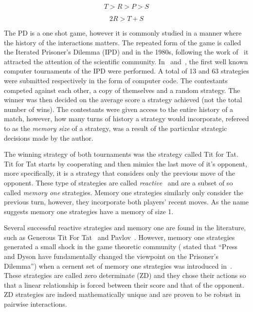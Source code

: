 \documentclass[10pt]{article}
\begin{document}
\begin{equation}\label{eq:pd_constrain_one}
    T > R > P > S
\end{equation}

\begin{equation}\label{eq:pd_constrain_two}
    2R > T + S
\end{equation}

The PD is a one shot game, however it is commonly studied in a manner where the
history of the interactions matters. The repeated form of the game is called the
Iterated Prisoner's Dilemma (IPD) and in the 1980s, following the work
of~\cite{Axelrod1980a, Axelrod1980b} it attracted the attention of the
scientific community. In~\cite{Axelrod1980a} and~\cite{Axelrod1980b}, the first
well known computer tournaments of the IPD were performed. A total of 13 and 63
strategies were submitted respectively in the form of computer code. The
contestants competed against each other, a copy of themselves and a random
strategy. The winner was then decided on the average score a strategy achieved (not
the total number of wins). The contestants were given access to the entire
history of a match, however, how many turns of history a strategy would
incorporate, refereed to as the \textit{memory size} of a strategy, was a result
of the particular strategic decisions made by the author.

The winning strategy of both tournaments was the strategy called Tit for Tat.
Tit for Tat starts by cooperating and then mimics the last move of it's
opponent, more specifically, it is a strategy that considers only the previous
move of the opponent. These type of strategies are called
\textit{reactive}~\cite{Nowak1989} and are a subset of so called \textit{memory
one} strategies. Memory one strategies similarly only consider the previous
turn, however, they incorporate both players' recent moves. As the name suggests
memory one strategies have a memory of size 1.

Several successful reactive strategies and memory one are found in the
literature, such as Generous Tit For Tat~\cite{Nowak1990} and
Pavlov~\cite{Nowak1993}. However, memory one strategies generated a small shock
in the game theoretic community (\cite{Stewart2012} stated that ``Press and
Dyson have fundamentally changed the viewpoint on the Prisoner's Dilemma'') when
a cernent set of memory one strategies was introduced in~\cite{Press2012}. These
strategies are called zero determinate (ZD) and they chose their actions so that
a linear relationship is forced between their score and that of the opponent. ZD
strategies are indeed mathematically unique and are proven to be robust in pairwise
interactions.
\end{document}
